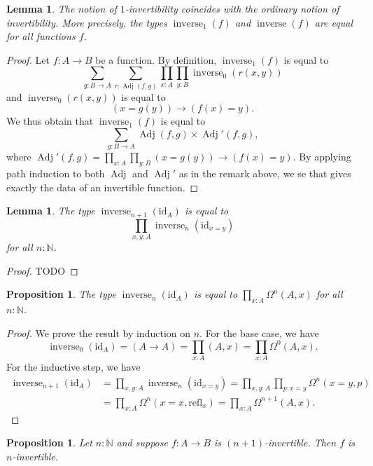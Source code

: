 \documentclass{article}
\theoremstyle{plain}
\newtheorem{proposition}[theorem]{Proposition}
\newtheorem{lemma}[theorem]{Lemma}
\theoremstyle{definition}
\theoremstyle{remark}
\newcommand{\id}{\mathrm{id}}
\newcommand{\refl}{\mathrm{refl}}
\newcommand{\N}{\mathbb{N}}
\newcommand{\lspace}[1]{\Omega^{#1}}
\DeclareMathOperator{\inverse}{inverse}
\DeclareMathOperator{\adj}{Adj}
\newcommand{\ninverse}[1]{\inverse_{#1}}
\begin{document}
\begin{lemma}
  The notion of \(1\)-invertibility coincides with the ordinary notion
  of invertibility. More precisely, the types \(\ninverse{1}(f)\) and
  \(\inverse(f)\) are equal for all functions \(f\).
\end{lemma}
\begin{proof}
  Let \(f : A \to B\) be a function. By definition, \(\ninverse{1}(f)\) is equal
  to
  \[\sum_{g : B \to A}\sum_{r : \adj(f, g)}\prod_{x : A}\prod_{y : B}\ninverse{0}(r(x,
    y))\]
  and \(\ninverse{0}(r(x, y))\) is equal to
  \[(x = g(y)) \to (f(x) = y).\]
  We thus obtain that \(\ninverse{1}(f)\) is equal to
  \[\sum_{g : B \to A}\adj(f, g) \times \adj'(f, g),\]
  where \(\adj'(f, g) = \prod_{x : A}\prod_{y : B}(x = g(y)) \to (f(x) = y)\). By applying
  path induction to both \(\adj\) and \(\adj'\) as in the remark above, we se that gives
  exactly the data of an invertible function.
\end{proof}

\begin{lemma}
  The type \(\ninverse{n + 1}(\id_{A})\) is equal to
  \[\prod_{x, y : A}\ninverse{n}(\id_{x = y})\]
  for all \(n : \N\).
\end{lemma}

\begin{proof}
  TODO
\end{proof}

\begin{proposition}
  \label{ninv-id}
  The type \(\ninverse{n}(\id_{A})\) is equal to \(\prod_{x : A}\lspace{n}(A, x)\)
  for all~\(n : \N\).
\end{proposition}

\begin{proof}
  We prove the result by induction on \(n\).
  For the base case, we have
  \[\ninverse{0}(\id_{A}) = (A \to A) =
    \prod_{x : A}(A, x) = \prod_{x : A}\lspace{0}(A, x).\]
  For the inductive step, we have
  \begin{align*}
    \ninverse{n + 1}{(\id_{A})} &= \prod_{x, y : A}\ninverse{n}(\id_{x = y}) =
                                  \prod_{x, y : A}\prod_{p : x = y}\lspace{n}(x = y, p) \\
                                &= \prod_{x : A} \lspace{n}(x = x, \refl_{x}) =
                                  \prod_{x : A}\lspace{n + 1}(A, x).
  \end{align*}
\end{proof}

\begin{proposition}
  \label{inverse-system}
  Let \(n : \N\) and suppose \(f : A \to B\) is \((n + 1)\)-invertible.
  Then \(f\) is \(n\)-invertible.
\end{proposition}
\end{document}
